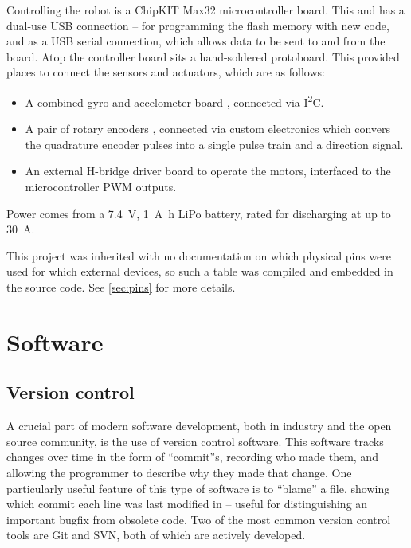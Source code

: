 \documentclass[main.tex]{subfiles}
\begin{document}
	Controlling the robot is a ChipKIT Max32 microcontroller board\cite{max32}. This and has a dual-use USB connection -- for programming the flash memory with new code, and as a USB serial connection, which allows data to be sent to and from the board. Atop the controller board sits a hand-soldered protoboard. This provided places to connect the sensors and actuators, which are as follows:
	\begin{itemize}[noitemsep]
		\item
			A combined gyro and accelometer board \cite{imu}, connected via I\textsuperscript{2}C.
		\item
			A pair of rotary encoders \cite{encoder}, connected via custom electronics which convers the quadrature encoder pulses into a single pulse train and a direction signal.
		\item
			An external H-bridge driver board to operate the motors, interfaced to the microcontroller PWM outputs.
	\end{itemize}
	Power comes from a \SI{7.4}{\volt}, \SI{1}{\ampere\hour}  LiPo battery, rated for discharging at up to \SI{30}{\ampere}.

	This project was inherited with no documentation on which physical pins were used for which external devices, so such a table was compiled and embedded in the source code.
	See \cref{sec:pins} for more details.

\section{Software}

	\subsection{Version control}

	A crucial part of modern software development, both in industry and the open source community, is the use of version control software. 
	This software tracks changes over time in the form of \enquote{commit}s, recording who made them, and allowing the programmer to describe why they made that change.
	One particularly useful feature of this type of software is to \enquote{blame} a file, showing which commit each line was last modified in -- useful for distinguishing an important bugfix from obsolete code.
	Two of the most common version control tools are Git and SVN, both of which are actively developed.
\end{document}
